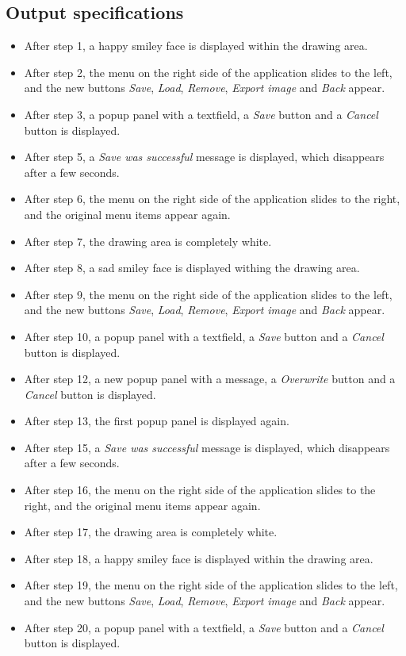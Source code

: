 \subsection*{Output specifications}
\begin{itemize}
\item After step 1, a happy smiley face is displayed within the drawing area.
\item After step 2, the menu on the right side of the application slides to the left, and the new buttons \emph{Save}, \emph{Load}, \emph{Remove}, \emph{Export image} and \emph{Back} appear.
\item After step 3, a popup panel with a textfield, a \emph{Save} button and a \emph{Cancel} button is displayed.
\item After step 5, a \emph{Save was successful} message is displayed, which disappears after a few seconds.

\item After step 6, the menu on the right side of the application slides to the right, and the original menu items appear again.
\item After step 7, the drawing area is completely white.
\item After step 8, a sad smiley face is displayed withing the drawing area.
\item After step 9, the menu on the right side of the application slides to the left, and the new buttons \emph{Save}, \emph{Load}, \emph{Remove}, \emph{Export image} and \emph{Back} appear.
\item After step 10, a popup panel with a textfield, a \emph{Save} button and a \emph{Cancel} button is displayed.

\item After step 12, a new popup panel with a message, a \emph{Overwrite} button and a \emph{Cancel} button is displayed.
\item After step 13, the first popup panel is displayed again.
\item After step 15, a \emph{Save was successful} message is displayed, which disappears after a few seconds.

\item After step 16, the menu on the right side of the application slides to the right, and the original menu items appear again.
\item After step 17, the drawing area is completely white.
\item After step 18, a happy smiley face is displayed within the drawing area.
\item After step 19, the menu on the right side of the application slides to the left, and the new buttons \emph{Save}, \emph{Load}, \emph{Remove}, \emph{Export image} and \emph{Back} appear.
\item After step 20, a popup panel with a textfield, a \emph{Save} button and a \emph{Cancel} button is displayed.


\end{itemize}
